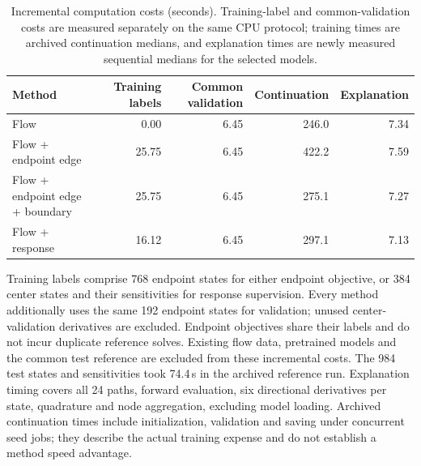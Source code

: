 \begin{table}[t]\centering\footnotesize
\caption{Incremental computation costs (seconds). Training-label and common-validation costs are measured separately on the same CPU protocol; training times are archived continuation medians, and explanation times are newly measured sequential medians for the selected models.}
\label{tab:learning-costs}
\begin{tabular}{lrrrr}\toprule Method & Training labels & Common validation & Continuation & Explanation\\\midrule
Flow & 0.00 & 6.45 & 246.0 & 7.34\\
Flow + endpoint edge & 25.75 & 6.45 & 422.2 & 7.59\\
Flow + endpoint edge + boundary & 25.75 & 6.45 & 275.1 & 7.27\\
Flow + response & 16.12 & 6.45 & 297.1 & 7.13\\
\bottomrule\end{tabular}\end{table}
Training labels comprise 768 endpoint states for either endpoint objective, or 384 center states and their sensitivities for response supervision. Every method additionally uses the same 192 endpoint states for validation; unused center-validation derivatives are excluded. Endpoint objectives share their labels and do not incur duplicate reference solves. Existing flow data, pretrained models and the common test reference are excluded from these incremental costs. The 984 test states and sensitivities took 74.4\,s in the archived reference run. Explanation timing covers all 24 paths, forward evaluation, six directional derivatives per state, quadrature and node aggregation, excluding model loading. Archived continuation times include initialization, validation and saving under concurrent seed jobs; they describe the actual training expense and do not establish a method speed advantage.
